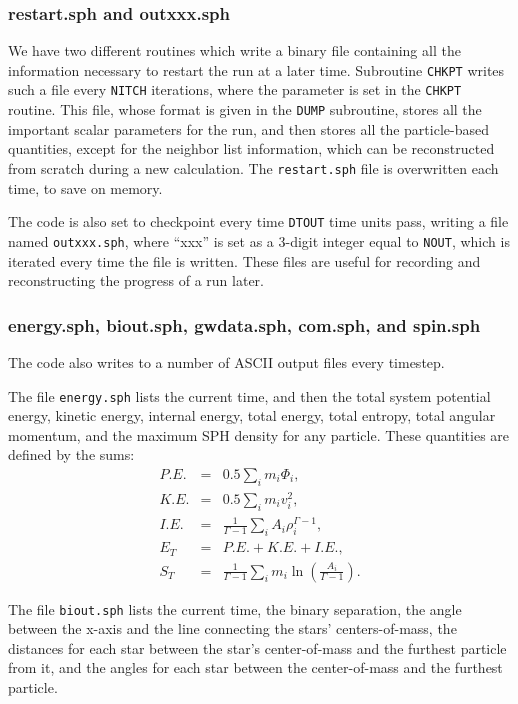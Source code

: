 \subsubsection{restart.sph and outxxx.sph}
\label{io:ou:du}
We have two different routines which write a binary file containing
all the information necessary to restart the run at a later time.
Subroutine {\tt CHKPT} writes such a file every {\tt NITCH}
iterations, where the parameter is set in the {\tt CHKPT} routine.  This
file, whose format is given in the {\tt DUMP} subroutine, stores all
the important scalar parameters for the run, and then stores all the
particle-based quantities, except for the neighbor list information,
which can be reconstructed from scratch during a new calculation. 
The {\tt restart.sph} file is overwritten each time, to save on memory.

The code is also set to checkpoint every time {\tt DTOUT} time units
pass, writing a file named {\tt outxxx.sph}, where ``xxx'' is set as a 
3-digit integer equal to {\tt NOUT}, which is iterated every time the
file is written.  These files are useful for recording and
reconstructing the progress of a run later.  

\subsubsection{energy.sph, biout.sph, gwdata.sph, com.sph, and spin.sph}
\label{io:ou:en}
The code also writes to a number of ASCII output files every
timestep.  

The file {\tt energy.sph} lists the current time, and then the total
system potential energy, kinetic energy, internal energy, total
energy, total entropy, total angular momentum, and the maximum SPH
density for any particle.  These quantities are defined by the sums:
\begin{eqnarray}
P.E.&=&0.5\sum_i m_i \Phi_i,\\
K.E.&=&0.5 \sum_i m_i v_i^2,\\
I.E.&=&\frac{1}{\Gamma-1}\sum_i A_i \rho_i^{\Gamma-1},\\
E_T&=&P.E.+K.E.+I.E.,\\
S_T&=&\frac{1}{\Gamma-1}\sum_i m_i
\ln\left(\frac{A_i}{\Gamma-1}\right).
\end{eqnarray}

The file {\tt biout.sph} lists the current time, the binary
separation, the angle between the x-axis and the line connecting the
stars' centers-of-mass, the distances for each star between the star's
center-of-mass and the furthest particle from it, and the angles for
each star between the center-of-mass and the furthest particle.

